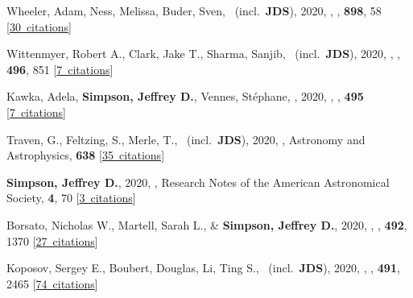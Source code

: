 \item[{\color{numcolor}\scriptsize46}] Wheeler, Adam, Ness, Melissa, Buder, Sven, \etal\ (incl.\ \textbf{JDS}), 2020, , \apj, \textbf{898}, 58 [\href{https://ui.adsabs.harvard.edu/#abs/2020ApJ...898...58W}{30~citations}]

\item[{\color{numcolor}\scriptsize45}] Wittenmyer, Robert A., Clark, Jake T., Sharma, Sanjib, \etal\ (incl.\ \textbf{JDS}), 2020, , \mnras, \textbf{496}, 851 [\href{https://ui.adsabs.harvard.edu/#abs/2020MNRAS.496..851W}{7~citations}]

\item[{\color{numcolor}\scriptsize44}] Kawka, Adela, \textbf{Simpson, Jeffrey D.}, Vennes, St{\'e}phane, \etal, 2020, , \mnras, \textbf{495} [\href{https://ui.adsabs.harvard.edu/#abs/2020MNRAS.495L.129K}{7~citations}]

\item[{\color{numcolor}\scriptsize43}] Traven, G., Feltzing, S., Merle, T., \etal\ (incl.\ \textbf{JDS}), 2020, , Astronomy and Astrophysics, \textbf{638} [\href{https://ui.adsabs.harvard.edu/#abs/2020A&A...638A.145T}{35~citations}]

\item[{\color{numcolor}\scriptsize42}] \textbf{Simpson, Jeffrey D.}, 2020, , Research Notes of the American Astronomical Society, \textbf{4}, 70 [\href{https://ui.adsabs.harvard.edu/#abs/2020RNAAS...4...70S}{3~citations}]

\item[{\color{numcolor}\scriptsize41}] Borsato, Nicholas W., Martell, Sarah L., \& \textbf{Simpson, Jeffrey D.}, 2020, , \mnras, \textbf{492}, 1370 [\href{https://ui.adsabs.harvard.edu/#abs/2020MNRAS.492.1370B}{27~citations}]

\item[{\color{numcolor}\scriptsize40}] Koposov, Sergey E., Boubert, Douglas, Li, Ting S., \etal\ (incl.\ \textbf{JDS}), 2020, , \mnras, \textbf{491}, 2465 [\href{https://ui.adsabs.harvard.edu/#abs/2020MNRAS.491.2465K}{74~citations}]

